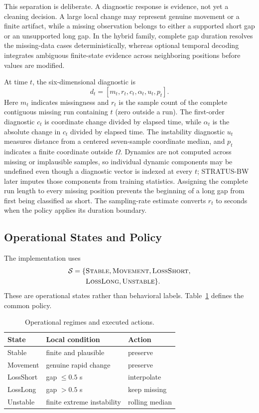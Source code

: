 \documentclass[sigconf,review]{acmart}
\newcommand{\methodBW}{\textsc{STRATUS-BW}\xspace}
\begin{document}
This separation is deliberate. A diagnostic response is evidence, not
yet a cleaning decision. A large local change may represent genuine
movement or a finite artifact, while a missing observation belongs to
either a supported short gap or an unsupported long gap. In the hybrid
family, complete gap duration resolves the missing-data cases
deterministically, whereas optional temporal decoding integrates
ambiguous finite-state evidence across neighboring positions before
values are modified.

At time $t$, the six-dimensional diagnostic is
\[
d_t=[m_t,r_t,c_t,\alpha_t,u_t,p_t].
\]
Here $m_t$ indicates missingness and $r_t$ is the sample count of the complete contiguous missing run containing $t$ (zero outside a run). The first-order diagnostic $c_t$ is coordinate change divided by elapsed time, while $\alpha_t$ is the absolute change in $c_t$ divided by elapsed time. The instability diagnostic $u_t$ measures distance from a centered seven-sample coordinate median, and $p_t$ indicates a finite coordinate outside $\Omega$. Dynamics are not computed across missing or implausible samples, so individual dynamic components may be undefined even though a diagnostic vector is indexed at every $t$; \methodBW later imputes those components from training statistics. Assigning the complete run length to every missing position prevents the beginning of a long gap from first being classified as short. The sampling-rate estimate converts $r_t$ to seconds when the policy applies its duration boundary.

\subsection{Operational States and Policy}

The implementation uses
\[
\begin{aligned}
\mathcal{S}=\{&\textsc{Stable},\textsc{Movement},\textsc{LossShort},\\
              &\textsc{LossLong},\textsc{Unstable}\}.
\end{aligned}
\]
These are operational states rather than behavioral labels. Table~\ref{tab:states_actions} defines the common policy.

\begin{table}[h]
\centering
\caption{Operational regimes and executed actions.}
\label{tab:states_actions}
\small
\begin{tabular}{lll}
\toprule
State & Local condition & Action \\
\midrule
Stable & finite and plausible & preserve \\
Movement & genuine rapid change & preserve \\
LossShort & gap $\leq 0.5$ s & interpolate \\
LossLong & gap $>0.5$ s & keep missing \\
Unstable & finite extreme instability & rolling median \\
\bottomrule
\end{tabular}
\end{table}
\end{document}
